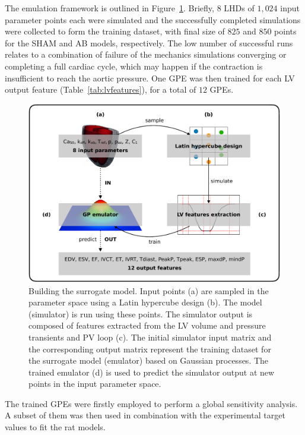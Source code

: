 \vspace{0.2cm}
The emulation framework is outlined in Figure~\ref{fig:emulatorframework}. Briefly, $8$ LHDs of $1,024$ input parameter points each were simulated and the successfully completed simulations were collected to form the training dataset, with final size of $825$ and $850$ points for the SHAM and AB models, respectively. The low number of successful runs relates to a combination of failure of the mechanics simulations converging or completing a full cardiac cycle, which may happen if the contraction is insufficient to reach the aortic pressure. One GPE was then trained for each LV output feature (Table~\ref{tab:lvfeatures}), for a total of $12$ GPEs. 

\begin{figure}[ht!]
    \myfloatalign
    \includegraphics[width=\textwidth]{figures/chapter04/emulator_framework.pdf}
    \caption{Building the surrogate model. Input points (a) are sampled in the parameter space using a Latin hypercube design (b). The model (simulator) is run using these points. The simulator output is composed of features extracted from the LV volume and pressure transients and PV loop (c). The initial simulator input matrix and the corresponding output matrix represent the training dataset for the surrogate model (emulator) based on Gaussian processes. The trained emulator (d) is used to predict the simulator output at new points in the input parameter space.}
    \label{fig:emulatorframework}
\end{figure}

\vspace{0.2cm}
The trained GPEs were firstly employed to perform a global sensitivity analysis. A subset of them was then used in combination with the experimental target values to fit the rat models.


